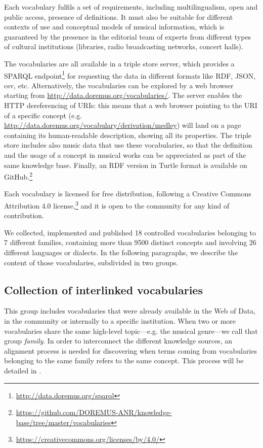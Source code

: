 \documentclass{article}
\begin{document}
Each vocabulary fulfils a set of requirements, including multilingualism, open and public access, presence of definitions. It must also be suitable for different contexts of use and conceptual models of musical information, which is guaranteed by the presence in the editorial team of experts from different types of cultural institutions (libraries, radio broadcasting networks, concert halls).

The vocabularies are all available in a triple store server, which provides a SPARQL endpoint\footnote{\url{http://data.doremus.org/sparql}} for requesting the data in different formats like RDF, JSON, csv, etc. Alternatively, the vocabularies can be explored by a web browser starting from
\url{http://data.doremus.org/vocabularies/}.
The server enables the HTTP dereferencing of URIs: this means that a web browser pointing to the URI of a specific concept (e.g.
\url{http://data.doremus.org/vocabulary/derivation/medley}) will land on a page containing its human-readable description, showing all its properties. The triple store includes also music data that use these vocabularies, so that the definition and the usage of a concept in musical works can be appreciated as part of the same knowledge base. Finally, an RDF version in Turtle format is available on GitHub.\footnote{
\url{https://github.com/DOREMUS-ANR/knowledge-base/tree/master/vocabularies}
}

Each vocabulary is licensed for free distribution, following a Creative Commons Attribution 4.0 license,\footnote{\url{https://creativecommons.org/licenses/by/4.0/}} and it is open to the community for any kind of contribution.  

We collected, implemented and published 18 controlled vocabularies belonging to 7 different families, containing more than 9500 distinct concepts and involving 26 different languages or dialects. In the following paragraphs, we describe the content of those vocabularies, subdivided in two groups.

\subsection{Collection of interlinked vocabularies}\label{sec:collection}
This group includes vocabularies that were already available in the Web of Data, in the community or internally to a specific institution. When two or more vocabularies share the same high-level topic---e.g. the musical genre---we call that group \textit{family}. In order to interconnect the different knowledge sources, an alignment process is needed for discovering when terms coming from vocabularies belonging to the same family refers to the same concept. This process will be detailed in .
\end{document}
